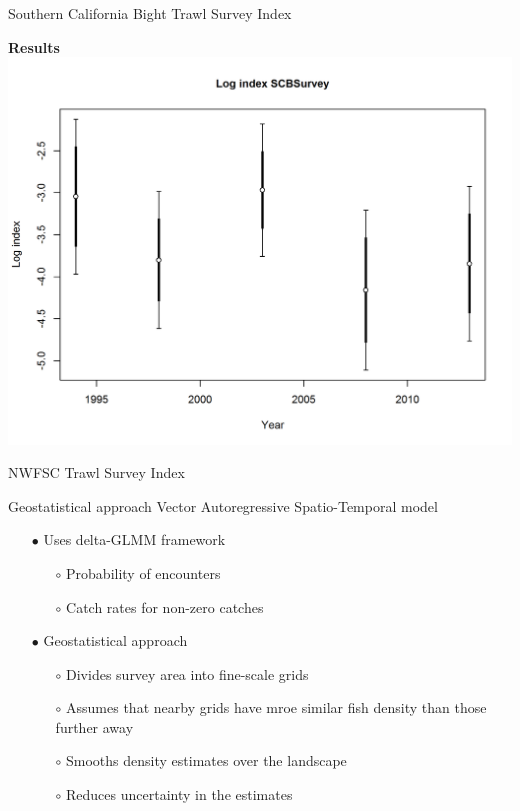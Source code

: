 \documentclass[ignorenonframetext,]{beamer}
\begin{document}
\begin{frame}{Southern California Bight Trawl Survey Index}

\textbf{Results}\\
\centering
\includegraphics{r4ss/plots_mod1/index4_logcpuedata_SCBSurvey.png}

\end{frame}

\begin{frame}{NWFSC Trawl Survey Index}

Geostatistical approach Vector Autoregressive Spatio-Temporal model

\begin{itemize}
\item[$\bullet$] Uses delta-GLMM framework
\begin{itemize}
\item[$\circ$] Probability of encounters
\item[$\circ$] Catch rates for non-zero catches
\end{itemize}
\item[$\bullet$] Geostatistical approach
\begin{itemize}
\item[$\circ$] Divides survey area into fine-scale grids
\item[$\circ$] Assumes that nearby grids have mroe similar fish density than those further away
\item[$\circ$] Smooths density estimates over the landscape
\item[$\circ$] Reduces uncertainty in the estimates
\end{itemize}
\end{itemize}

\end{frame}
\end{document}
